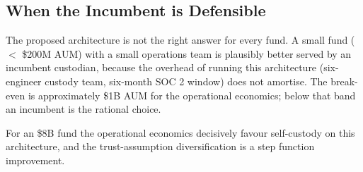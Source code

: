\subsection{When the Incumbent is Defensible}

The proposed architecture is not the right answer for every fund.
A small fund (\(<\) \$200M AUM) with a small operations team is
plausibly better served by an incumbent custodian, because the
overhead of running this architecture (six-engineer custody team,
six-month SOC 2 window) does not amortise. The break-even is
approximately \$1B AUM for the operational economics; below that
band an incumbent is the rational choice.

For an \$8B fund the operational economics decisively favour
self-custody on this architecture, and the trust-assumption
diversification is a step function improvement.

